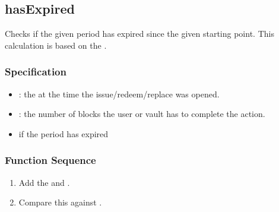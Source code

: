 \documentclass[a4paper,10pt,english]{sphinxmanual}
\begin{document}
\subsection{hasExpired}
\label{\detokenize{spec/security:hasexpired}}\label{\detokenize{spec/security:id4}}
Checks if the given period has expired since the given starting point. This calculation is based on the {\hyperref[\detokenize{spec/security:activeblockcount}]{}}.


\subsubsection{Specification}
\label{\detokenize{spec/security:id5}}


\begin{itemize}
\item {} 
: the {\hyperref[\detokenize{spec/security:activeblockcount}]{}} at the time the issue/redeem/replace was opened.

\item {} 
: the number of blocks the user or vault has to complete the action.

\end{itemize}

\begin{itemize}
\item {} 
 if the period has expired

\end{itemize}


\subsubsection{Function Sequence}
\label{\detokenize{spec/security:id6}}\begin{enumerate}
%
\item {} 
Add the  and .

\item {} 
Compare this against {\hyperref[\detokenize{spec/security:activeblockcount}]{}}.

\end{enumerate}
\end{document}
